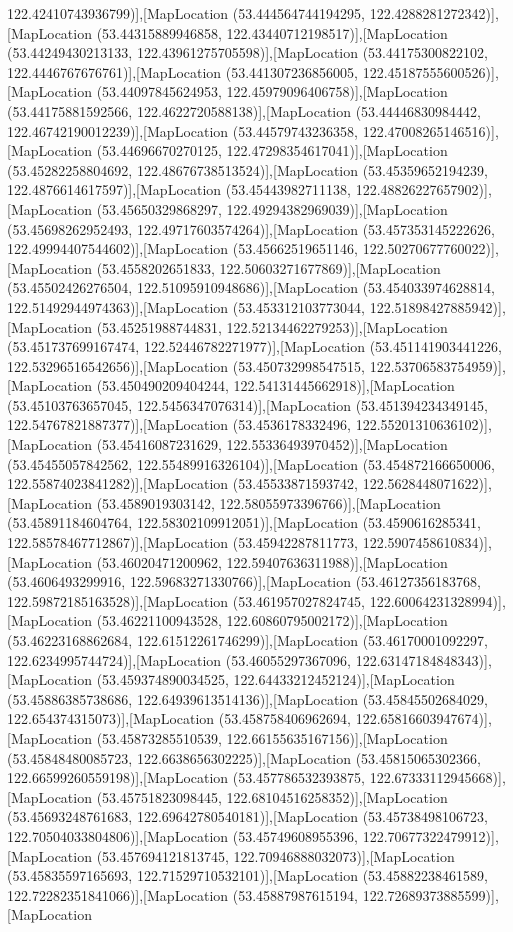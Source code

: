 122.42410743936799)],[MapLocation (53.444564744194295, 122.4288281272342)],[MapLocation (53.44315889946858, 122.43440712198517)],[MapLocation (53.44249430213133, 122.43961275705598)],[MapLocation (53.44175300822102, 122.4446767676761)],[MapLocation (53.441307236856005, 122.45187555600526)],[MapLocation (53.44097845624953, 122.45979096406758)],[MapLocation (53.44175881592566, 122.4622720588138)],[MapLocation (53.44446830984442, 122.46742190012239)],[MapLocation (53.44579743236358, 122.47008265146516)],[MapLocation (53.44696670270125, 122.47298354617041)],[MapLocation (53.45282258804692, 122.48676738513524)],[MapLocation (53.45359652194239, 122.4876614617597)],[MapLocation (53.45443982711138, 122.48826227657902)],[MapLocation (53.45650329868297, 122.49294382969039)],[MapLocation (53.45698262952493, 122.49717603574264)],[MapLocation (53.457353145222626, 122.49994407544602)],[MapLocation (53.45662519651146, 122.50270677760022)],[MapLocation (53.4558202651833, 122.50603271677869)],[MapLocation (53.45502426276504, 122.51095910948686)],[MapLocation (53.454033974628814, 122.51492944974363)],[MapLocation (53.453312103773044, 122.51898427885942)],[MapLocation (53.45251988744831, 122.52134462279253)],[MapLocation (53.451737699167474, 122.52446782271977)],[MapLocation (53.451141903441226, 122.53296516542656)],[MapLocation (53.450732998547515, 122.53706583754959)],[MapLocation (53.450490209404244, 122.54131445662918)],[MapLocation (53.45103763657045, 122.5456347076314)],[MapLocation (53.451394234349145, 122.54767821887377)],[MapLocation (53.4536178332496, 122.55201310636102)],[MapLocation (53.45416087231629, 122.55336493970452)],[MapLocation (53.45455057842562, 122.55489916326104)],[MapLocation (53.454872166650006, 122.55874023841282)],[MapLocation (53.45533871593742, 122.5628448071622)],[MapLocation (53.4589019303142, 122.58055973396766)],[MapLocation (53.45891184604764, 122.58302109912051)],[MapLocation (53.4590616285341, 122.58578467712867)],[MapLocation (53.45942287811773, 122.5907458610834)],[MapLocation (53.46020471200962, 122.59407636311988)],[MapLocation (53.4606493299916, 122.59683271330766)],[MapLocation (53.46127356183768, 122.59872185163528)],[MapLocation (53.461957027824745, 122.60064231328994)],[MapLocation (53.46221100943528, 122.60860795002172)],[MapLocation (53.46223168862684, 122.61512261746299)],[MapLocation (53.46170001092297, 122.6234995744724)],[MapLocation (53.46055297367096, 122.63147184848343)],[MapLocation (53.459374890034525, 122.64433212452124)],[MapLocation (53.45886385738686, 122.64939613514136)],[MapLocation (53.45845502684029, 122.654374315073)],[MapLocation (53.458758406962694, 122.65816603947674)],[MapLocation (53.45873285510539, 122.66155635167156)],[MapLocation (53.45848480085723, 122.6638656302225)],[MapLocation (53.45815065302366, 122.66599260559198)],[MapLocation (53.457786532393875, 122.67333112945668)],[MapLocation (53.45751823098445, 122.68104516258352)],[MapLocation (53.45693248761683, 122.69642780540181)],[MapLocation (53.45738498106723, 122.70504033804806)],[MapLocation (53.45749608955396, 122.70677322479912)],[MapLocation (53.457694121813745, 122.70946888032073)],[MapLocation (53.45835597165693, 122.71529710532101)],[MapLocation (53.45882238461589, 122.72282351841066)],[MapLocation (53.45887987615194, 122.72689373885599)],[MapLocation 